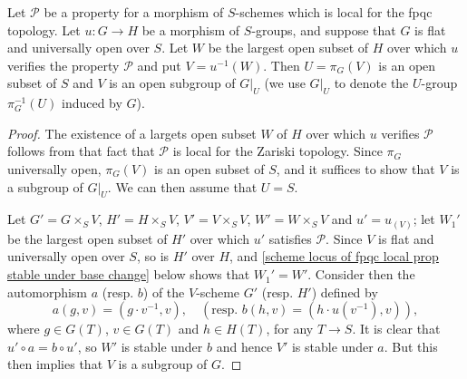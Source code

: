 \begin{proposition}\label{scheme group restriction to locus of fpqc local prop}
Let $\mathcal{P}$ be a property for a morphism of $S$-schemes which is local for the fpqc topology. Let $u:G\to H$ be a morphism of $S$-groups, and suppose that $G$ is flat and universally open over $S$. Let $W$ be the largest open subset of $H$ over which $u$ verifies the property $\mathcal{P}$ and put $V=u^{-1}(W)$. Then $U=\pi_G(V)$ is an open subset of $S$ and $V$ is an open subgroup of $G|_U$ (we use $G|_U$ to denote the $U$-group $\pi^{-1}_G(U)$ induced by $G$).
\end{proposition}
\begin{proof}
The existence of a largets open subset $W$ of $H$ over which $u$ verifies $\mathcal{P}$ follows from that fact that $\mathcal{P}$ is local for the Zariski topology. Since $\pi_G$ universally open, $\pi_G(V)$ is an open subset of $S$, and it suffices to show that $V$ is a subgroup of $G|_U$. We can then assume that $U=S$.\par
Let $G'=G\times_SV$, $H'=H\times_SV$, $V'=V\times_SV$, $W'=W\times_SV$ and $u'=u_{(V)}$; let $W_1'$ be the largest open subset of $H'$ over which $u'$ satisfies $\mathcal{P}$. Since $V$ is flat and universally open over $S$, so is $H'$ over $H$, and \cref{scheme locus of fpqc local prop stable under base change} below shows that $W_1'=W'$. Consider then the automorphism $a$ (resp. $b$) of the $V$-scheme $G'$ (resp. $H'$) defined by
\[a(g,v)=(g\cdot v^{-1},v),\quad (\text{resp. }b(h,v)=(h\cdot u(v^{-1}),v)),\]
where $g\in G(T)$, $v\in G(T)$ and $h\in H(T)$, for any $T\to S$. It is clear that $u'\circ a=b\circ u'$, so $W'$ is stable under $b$ and hence $V'$ is stable under $a$. But this then implies that $V$ is a subgroup of $G$.
\end{proof}

